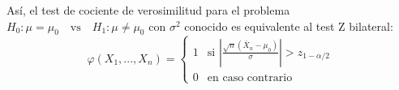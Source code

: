 \documentclass{article}
\begin{document}
Así, el test de cociente de verosimilitud para el problema $H_0: \mu = \mu_0 \quad \text{vs} \quad H_1: \mu \ne \mu_0$ con $\sigma^2$ conocido es equivalente al test Z bilateral:
$$ \varphi(X_1, ..., X_n) = \begin{cases} 1 & \text{si } \left|\frac{\sqrt{n}(\bar{X}_n - \mu_0)}{\sigma}\right| > z_{1-\alpha/2} \\ 0 & \text{en caso contrario} \end{cases} $$
\end{document}
